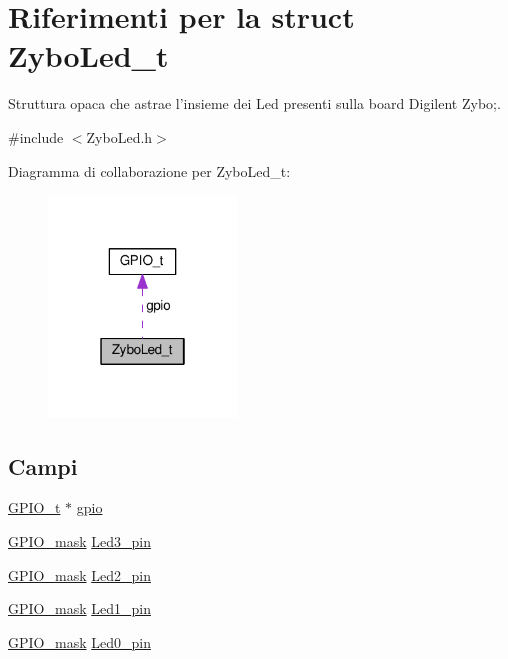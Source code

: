 \hypertarget{struct_zybo_led__t}{\section{Riferimenti per la struct Zybo\+Led\+\_\+t}
\label{struct_zybo_led__t}
}


Struttura opaca che astrae l'insieme dei Led presenti sulla board Digilent Zybo;.  




{\ttfamily \#include $<$Zybo\+Led.\+h$>$}



Diagramma di collaborazione per Zybo\+Led\+\_\+t\+:\nopagebreak
\begin{figure}[H]
\begin{center}
\leavevmode
\includegraphics[width=142pt]{struct_zybo_led__t__coll__graph}
\end{center}
\end{figure}
\subsection*{Campi}
\begin{DoxyCompactItemize}
\item 
\hyperlink{struct_g_p_i_o__t}{G\+P\+I\+O\+\_\+t} $\ast$ \hyperlink{struct_zybo_led__t_acb3116190992a4d8d26545c103304d27}{gpio}
\item 
\hyperlink{group___g_p_i_o_ga6d5aef8a8a54ee2f602d47252ff66595}{G\+P\+I\+O\+\_\+mask} \hyperlink{struct_zybo_led__t_a85b108a2f134972366da967a9489068f}{Led3\+\_\+pin}
\item 
\hyperlink{group___g_p_i_o_ga6d5aef8a8a54ee2f602d47252ff66595}{G\+P\+I\+O\+\_\+mask} \hyperlink{struct_zybo_led__t_a566ca7784af030de3be9244c99066a5c}{Led2\+\_\+pin}
\item 
\hyperlink{group___g_p_i_o_ga6d5aef8a8a54ee2f602d47252ff66595}{G\+P\+I\+O\+\_\+mask} \hyperlink{struct_zybo_led__t_a2ee8b92c08972eb1b5bb1b72f4a9d305}{Led1\+\_\+pin}
\item 
\hyperlink{group___g_p_i_o_ga6d5aef8a8a54ee2f602d47252ff66595}{G\+P\+I\+O\+\_\+mask} \hyperlink{struct_zybo_led__t_aa4d077e557e43132a3100ab30b60165c}{Led0\+\_\+pin}
\end{DoxyCompactItemize}


